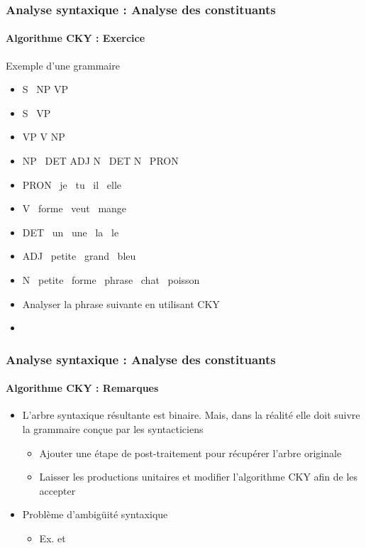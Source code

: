 \documentclass[xcolor=table]{beamer}
\begin{document}
\begin{frame}
\frametitle{Analyse syntaxique : Analyse des constituants}
\framesubtitle{Algorithme CKY : Exercice}

\vspace{-6pt}
\begin{exampleblock}{Exemple d'une grammaire}
	\begin{itemize}
		\item S \textrightarrow\ NP VP 
		\item S \textrightarrow\ VP 
		\item VP \textrightarrow V NP
		\item NP \textrightarrow\ DET ADJ N \textbar\ DET N \textbar\ PRON 
		\item PRON \textrightarrow\ je \textbar\ tu \textbar\ il \textbar\ elle
		\item V \textrightarrow\ forme \textbar\ veut \textbar\ mange 
		\item DET \textrightarrow\ un \textbar\ une \textbar\ la \textbar\ le
		\item ADJ \textrightarrow\ petite \textbar\ grand \textbar\ bleu 
		\item N \textrightarrow\ petite \textbar\ forme \textbar\ phrase \textbar\ chat \textbar\ poisson
	\end{itemize}
\end{exampleblock}\vspace{-6pt}

\begin{itemize}
	\item Analyser la phrase suivante en utilisant CKY 
	\item {}
\end{itemize}

\end{frame}

\begin{frame}
\frametitle{Analyse syntaxique : Analyse des constituants}
\framesubtitle{Algorithme CKY : Remarques}

\begin{itemize}
	\item L'arbre syntaxique résultante est binaire. Mais, dans la réalité elle doit suivre la grammaire conçue par les syntacticiens
	\begin{itemize}
		\item Ajouter une étape de post-traitement pour récupérer l'arbre originale
		\item Laisser les productions unitaires et modifier l'algorithme CKY afin de les accepter
	\end{itemize}
	\item Problème d'ambigüité syntaxique 
	\begin{itemize}
		\item Ex.  et 
	\end{itemize}
\end{itemize}

\end{frame}
\end{document}
